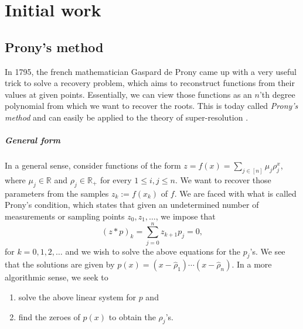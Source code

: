 \chapter{Initial work}
\section{Prony's method}
In 1795, the french mathematician Gaspard de Prony came up with a very useful trick to solve a recovery problem, which aims to reconstruct functions from their values at given points. Essentially, we can view those functions as an $n$'th degree polynomial from which we want to recover the roots. This is today called \textit{Prony's method} and can easily be applied to the theory of super-resolution \cite{pronyMethod}.
\paragraph{General form} In a general sense, consider functions of the form $z=f(x)=\sum_{j\in[n]}\mu_j\rho_j^x$, where $\mu_j\in\mathbb{R}$ and $\rho_j\in\mathbb{R}_+$ for every $1\leq i,j\leq n$. We want to recover those parameters from the samples $z_k:=f(x_k)$ of $f$. We are faced with what is called Prony's condition, which states that given an undetermined number of measurements or sampling points $z_0,z_1,\ldots$, we impose that $$(z*p)_k=\sum_{j=0}^n z_{k+1}p_j=0,$$ for $k=0,1,2,\ldots$ and we wish to solve the above equations for the $p_j$'s. We see that the solutions are given by $p(x)=(x-\widehat{\rho}_1)\cdots(x-\widehat{\rho}_n)$. In a more algorithmic sense, we seek to 
\begin{enumerate}
    \item solve the above linear system for $p$ and 
    \item find the zeroes of $p(x)$ to obtain the $\rho_j$'s.
\end{enumerate}
